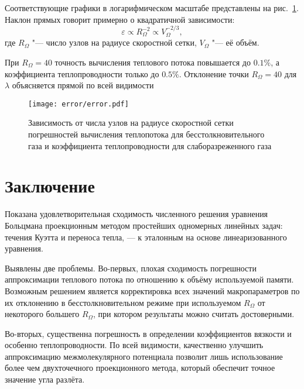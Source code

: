 \documentclass[a4paper,12pt]{article}
\begin{document}
Соответствующие графики в логарифмическом масштабе представлены на рис.~\ref{fig:error}.
Наклон прямых говорит примерно о квадратичной зависимости:
\[ \varepsilon \propto R_\Omega^{-2} \propto V_\Omega^{-2/3}, \]
где \(R_\Omega\) "--- число узлов на радиусе скоростной сетки, \(V_\Omega\) "--- её объём.

При \(R_\Omega = 40\) точность вычисления теплового потока повышается до \(0.1\%\),
а коэффициента теплопроводности только до \(0.5\%\).
Отклонение точки \(R_\Omega = 40\) для \(\lambda\) объясняется прямой по всей видимости

\begin{figure}
    \centering
    \texttt{[image: error/error.pdf]}
    \caption{
        Зависимость от числа узлов на радиусе скоростной сетки погрешностей вычисления
        теплопотока для бесстолкновительного газа и коэффициента теплопроводности для слаборазреженного газа
    }\label{fig:error}
\end{figure}

\section{Заключение}

Показана удовлетворительная сходимость численного решения уравнения Больцмана проекционным методом
простейших одномерных линейных задач: течения Куэтта и переноса тепла, --- к эталонным на основе
линеаризованного уравнения.

Выявлены две проблемы. Во-первых, плохая сходимость погрешности аппроксимации теплового потока по отношению к
объёму используемой памяти. Возможным решением является корректировка всех значений макропараметров
по их отклонению в бесстолкновительном режиме при используемом \(R_\Omega\) от некоторого большего \(R_\Omega\),
при котором результаты можно считать достоверными.

Во-вторых, существенна погрешность в определении коэффициентов вязкости и особенно теплопроводности.
По всей видимости, качественно улучшить аппроксимацию межмолекулярного потенциала позволит лишь использование
более чем двухточечного проекционного метода, который обеспечит точное значение угла разлёта.

\appendix
\appendixpage



\printbibliography
\end{document}
